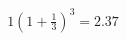 \documentclass[preview]{standalone}
\begin{document}
\begin{align*}
1\left( 1 + \frac{1}{3} \right)^3 = 2.37
\end{align*}
\end{document}
